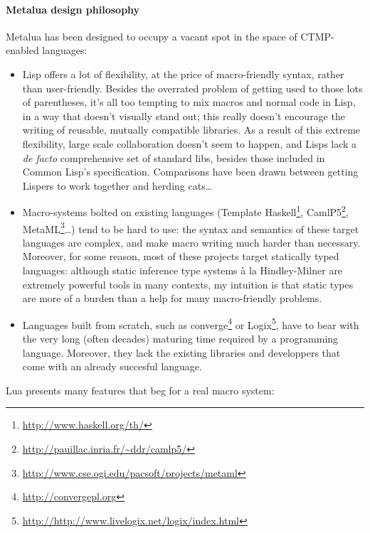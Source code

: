 \paragraph{Metalua design philosophy}
Metalua has been designed to occupy a vacant spot in the space of
CTMP-enabled languages:
\begin{itemize}

\item Lisp offers a lot of flexibility, at the price of macro-friendly
  syntax, rather than user-friendly. Besides the overrated problem of
  getting used to those lots of parentheses, it's all too tempting to
  mix macros and normal code in Lisp, in a way that doesn't visually
  stand out; this really doesn't encourage the writing of reusable,
  mutually compatible libraries. As a result of this extreme
  flexibility, large scale collaboration doesn't seem to happen, and
  Lisps lack a {\em de facto} comprehensive set of standard libs,
  besides those included in Common Lisp's specification. Comparisons
  have been drawn between getting Lispers to work together and herding
  cats\ldots

\item Macro-systems bolted on existing languages (Template
  Haskell\footnote{\url{http://www.haskell.org/th/}},
  CamlP5\footnote{\url{http://pauillac.inria.fr/~ddr/camlp5/}},
  MetaML\footnote{\url{http://www.cse.ogi.edu/pacsoft/projects/metaml}}\ldots)
  tend to be hard to use: the syntax and semantics of these target languages are
  complex, and make macro writing much harder than necessary. Moreover, for some
  reason, most of these projects target statically typed languages: although
  static inference type systems {\`a la} Hindley-Milner are extremely powerful
  tools in many contexts, my intuition is that static types are more of a burden
  than a help for many macro-friendly problems.

\item Languages built from scratch, such as
  converge\footnote{\url{http://convergepl.org}} or
  Logix\footnote{\url{http://http://www.livelogix.net/logix/index.html}}, have
  to bear with the very long (often decades) maturing time required by a
  programming language. Moreover, they lack the existing libraries and
  developpers that come with an already succesful language.

\end{itemize}

\noindent Lua presents many features that beg for a real macro system:

